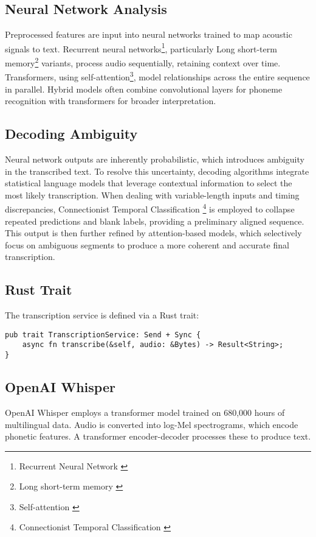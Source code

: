 \subsection{Neural Network Analysis}
Preprocessed features are input into neural networks trained to map acoustic signals to text.
Recurrent neural networks\footnote{Recurrent Neural Network \cite{rnn}},
particularly Long short-term memory\footnote{Long short-term memory \cite{lstm}} variants, process audio sequentially, retaining context over time.
Transformers, using self-attention\footnote{Self-attention \cite{self-attention}}, model relationships across the entire sequence in parallel.
Hybrid models often combine convolutional layers for phoneme recognition with transformers for broader interpretation.

\subsection{Decoding Ambiguity}
Neural network outputs are inherently probabilistic, which introduces ambiguity in the transcribed text.
To resolve this uncertainty, decoding algorithms integrate statistical language models
that leverage contextual information to select the most likely transcription.
When dealing with variable-length inputs and timing discrepancies,
Connectionist Temporal Classification \footnote{Connectionist Temporal Classification \cite{ctc}}
is employed to collapse repeated predictions and blank labels, providing a preliminary aligned sequence.
This output is then further refined by attention-based models,
which selectively focus on ambiguous segments to produce a more coherent and accurate final transcription.

\subsection{Rust Trait}
The transcription service is defined via a Rust trait:

\begin{verbatim}
pub trait TranscriptionService: Send + Sync {
    async fn transcribe(&self, audio: &Bytes) -> Result<String>;
}
\end{verbatim}

\subsection{OpenAI Whisper}
OpenAI Whisper employs a transformer model trained on 680,000 hours of multilingual data.
Audio is converted into log-Mel spectrograms, which encode phonetic features.
A transformer encoder-decoder processes these to produce text.


